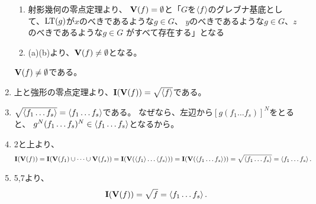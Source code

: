 \begin{myproof}
\begin{enumerate}
\begin{enumerate}
      \item 射影幾何の零点定理より、
      $\textbf V(f)= \emptyset$と「$G$を$\left\langle f \right\rangle$のグレブナ基底として、${\rm LT}(g)$が$x$のべきであるような$g\in G$、
      $y$のべきであるような$g\in G$、$z$のべきであるような$g\in G$
      がすべて存在する」となる
      \item (a)(b)より、$\textbf V(f)\neq \emptyset$となる。
    \end{enumerate}
    $\textbf V(f) \neq \emptyset$である。
    \item
    上と強形の零点定理より、$\textbf I(\textbf V(f)) = \sqrt{\left\langle f \right\rangle}$である。
    \item
    $\sqrt{\left\langle f_1\dots f_s \right\rangle} = \left\langle f_1 \dots f_s \right\rangle$である。
    なぜなら、左辺から$[g(f_1\dots f_s)]^N$をとると、
    $g^N(f_1 \dots f_s)^N \in \left\langle f_1\dots f_s \right\rangle$となるから。
    \item
    2と上より、
    \begin{align}
      \textbf I(\textbf V(f))
      =
      \textbf I(\textbf V(f_1)\cup \dots \cup \textbf V(f_s))
      =
      \textbf I(\textbf V(\left\langle f_1 \right\rangle\dots \left\langle f_s \right\rangle))
      =
      \textbf I(\textbf V(\left\langle f_1\dots f_s \right\rangle))
      =
      \sqrt{\left\langle f_1\dots f_s \right\rangle}
      =
      \left\langle f_1\dots f_s \right\rangle.
    \end{align}
    \item 5,7より、
    \begin{align}
      \textbf I(\textbf V(f)) = \sqrt{f} = \left\langle f_1 \dots f_s \right\rangle.
    \end{align}
  \end{enumerate}
\end{myproof}

